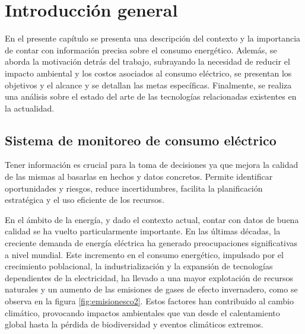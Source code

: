 

\chapter{Introducción general} %
En el presente capítulo se presenta una descripción del contexto y la importancia de contar con información precisa sobre el consumo energético. Además, se aborda la motivación detrás del trabajo, subrayando la necesidad de reducir el impacto ambiental y los costos asociados al consumo eléctrico, se presentan los objetivos y el alcance y se detallan las metas específicas. Finalmente, se realiza una análisis sobre el estado del arte de las tecnologías relacionadas existentes en la actualidad.

\label{Chapter1} %
\label{IntroGeneral}



\newcommand{\keyword}[1]{\textbf{#1}}
\newcommand{\tabhead}[1]{\textbf{#1}}
\newcommand{\code}[1]{\texttt{#1}}
\newcommand{\file}[1]{\texttt{\bfseries#1}}
\newcommand{\option}[1]{\texttt{\itshape#1}}
\newcommand{\grados}{$^{\circ}$}




\section{Sistema de monitoreo de consumo eléctrico}
Tener información es crucial para la toma de decisiones ya que mejora la calidad de las mismas al basarlas en hechos y datos concretos. Permite identificar oportunidades y riesgos, reduce incertidumbres, facilita la planificación estratégica y el uso eficiente de los recursos. 

En el ámbito de la energía, y dado el contexto actual, contar con datos de buena calidad se ha vuelto particularmente importante. En las últimas décadas, la creciente demanda de energía eléctrica ha generado preocupaciones significativas a nivel mundial. Este incremento en el consumo energético, impulsado por el crecimiento poblacional, la industrialización y la expansión de tecnologías dependientes de la electricidad, ha llevado a una mayor explotación de recursos naturales y un aumento de las emisiones de gases de efecto invernadero, como se observa en la figura \ref{fig:emisionesco2}. Estos factores han contribuido al cambio climático, provocando impactos ambientales que van desde el calentamiento global hasta la pérdida de biodiversidad y eventos climáticos extremos.


